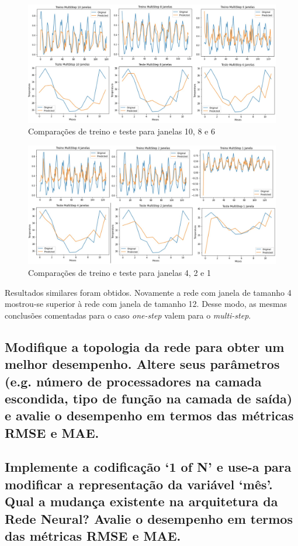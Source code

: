 \documentclass[12pt]{article}
\begin{document}
		\begin{figure}[H]
		\centering
		\includegraphics[width=0.9\linewidth]{Imagens/janelas/janelas6a10MULTI.jpg}
		\caption{Comparações de treino e teste para janelas 10, 8 e 6}
		\label{fig:janelas6a10MULTI}
	\end{figure}
	
	\begin{figure}[H]
		\centering
		\includegraphics[width=0.9\linewidth]{Imagens/janelas/janelas1a4MULTI.jpg}
		\caption{Comparações de treino e teste para janelas 4, 2 e 1}
		\label{fig:janelas1a4MULTI}
	\end{figure}

	Resultados similares foram obtidos. Novamente a rede com janela de tamanho 4 mostrou-se superior à rede com janela de tamanho 12. Desse modo, as mesmas conclusões comentadas para o caso \textit{one-step} valem para o \textit{multi-step}.
	
	\subsection{Modifique a topologia da rede para obter um melhor desempenho. Altere seus parâmetros (e.g. número de processadores na camada escondida, tipo de função na camada de saída) e avalie o desempenho em termos das métricas RMSE e MAE.}
	
	\subsection{Implemente a codificação ‘1 of N’ e use-a para modificar a representação da variável ‘mês’. Qual a mudança existente na arquitetura da Rede	Neural? Avalie o desempenho em termos das métricas RMSE e MAE.}
	

	 
	
\end{document}
